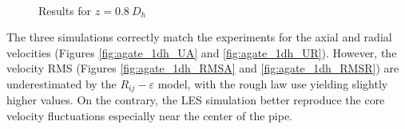 \begin{figure}[!h]
\centering
{}
\\
\caption{Results for $z=0.8\ D_{h}$}
\label{fig:agate_cfd_1dh}
\end{figure}

\npar


The three simulations correctly match the experiments for the axial and radial velocities (Figures \ref{fig:agate_1dh_UA} and \ref{fig:agate_1dh_UR}). However, the velocity RMS (Figures \ref{fig:agate_1dh_RMSA} and \ref{fig:agate_1dh_RMSR}) are underestimated by the $R_{ij}-\varepsilon$ model, with the rough law use yielding slightly higher values. On the contrary, the LES simulation better reproduce the core velocity fluctuations especially near the center of the pipe.



